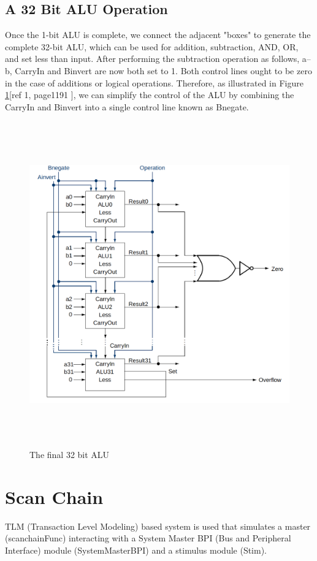 \documentclass[a4paper,12pt,english]{report}
\begin{document}
	\subsection{A 32 Bit ALU Operation}
Once the 1-bit ALU is complete, we connect the adjacent "boxes" to generate the complete 32-bit ALU, which can be used for addition, subtraction, AND, OR, and set less than input. After performing the subtraction operation as follows, a–b, CarryIn and Binvert are now both set to 1. Both control lines ought to be zero in the case of additions or logical operations. Therefore, as illustrated in Figure \ref{ref: 32 bit}[ref 1, page1191 ], we can simplify the control of the ALU by combining the CarryIn and Binvert into a single control line known as Bnegate.
 \begin{figure}[ht]
	\centering
	\includegraphics[width=14cm, height=14cm]{32bitalu} %
	\caption{The final 32 bit ALU}
	\label{ref: 32 bit}
\end{figure}
\section{Scan Chain}
TLM (Transaction Level Modeling) based system is used that simulates a master (scanchainFunc) interacting with a System Master BPI (Bus and Peripheral Interface) module (SystemMasterBPI) and a stimulus module (Stim).
\end{document}
